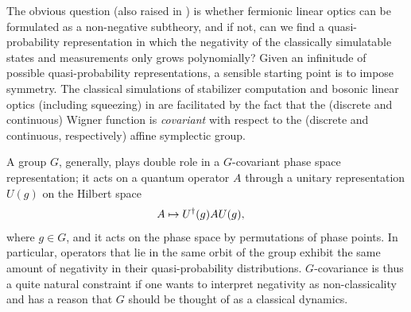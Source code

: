 The obvious question (also raised in \cite{brod_efficient_2016}) is whether fermionic linear optics can be formulated as a non-negative subtheory, and if not, can we find a quasi-probability representation in which the negativity of the classically simulatable states and measurements only grows polynomially? Given an infinitude of possible quasi-probability representations, a sensible starting point is to impose symmetry. The classical simulations of stabilizer computation and bosonic linear optics (including squeezing) in \cite{veitch_negative_2012,veitch_efficient_2013} are facilitated by the fact that the (discrete and continuous) Wigner function is \emph{covariant} with respect to the (discrete and continuous, respectively) affine symplectic group. 

A group $G$, generally, plays double role in a $G$-covariant phase space representation; it acts on a quantum operator $A$ through a unitary representation $U(g)$ on the Hilbert space
\begin{align}
	A &\mapsto U^{\dagger}(g) A U(g),
\end{align}
where $g \in G$, and it acts on the phase space by permutations of phase points. In particular, operators that lie in the same orbit of the group exhibit the same amount of negativity in their quasi-probability distributions. $G$-covariance is thus a quite natural constraint if one wants to interpret negativity as non-classicality and has a reason that $G$ should be thought of as a classical dynamics. %

